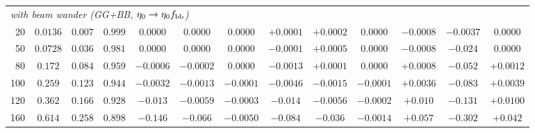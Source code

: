 \documentclass[11pt,a4paper]{article}
\theoremstyle{plain}
\theoremstyle{remark}
\begin{document}
\begin{table}[htbp]
\begin{tabular}{rcccccccccccc}
\midrule
\multicolumn{13}{l}{\emph{with beam wander (GG+BB, $\eta_0\to\eta_0f_{\rm bb}$)}} \\
20 & $0.0136$ & $0.007$ & $0.999$ & $0.0000$ & $0.0000$ & $0.0000$ & $+0.0001$ & $+0.0002$ & $0.0000$ & $-0.0008$ & $-0.0037$ & $0.0000$ \\
50 & $0.0728$ & $0.036$ & $0.981$ & $0.0000$ & $0.0000$ & $0.0000$ & $-0.0001$ & $+0.0005$ & $0.0000$ & $-0.0008$ & $-0.024$ & $0.0000$ \\
80 & $0.172$ & $0.084$ & $0.959$ & $-0.0006$ & $-0.0002$ & $0.0000$ & $-0.0013$ & $+0.0001$ & $0.0000$ & $+0.0008$ & $-0.052$ & $+0.0012$ \\
100 & $0.259$ & $0.123$ & $0.944$ & $-0.0032$ & $-0.0013$ & $-0.0001$ & $-0.0046$ & $-0.0015$ & $-0.0001$ & $+0.0036$ & $-0.083$ & $+0.0039$ \\
120 & $0.362$ & $0.166$ & $0.928$ & $-0.013$ & $-0.0059$ & $-0.0003$ & $-0.014$ & $-0.0056$ & $-0.0002$ & $+0.010$ & $-0.131$ & $+0.0100$ \\
160 & $0.614$ & $0.258$ & $0.898$ & $-0.146$ & $-0.066$ & $-0.0050$ & $-0.084$ & $-0.036$ & $-0.0014$ & $+0.057$ & $-0.302$ & $+0.042$ \\

\bottomrule
\end{tabular}
\end{table}
\end{document}
